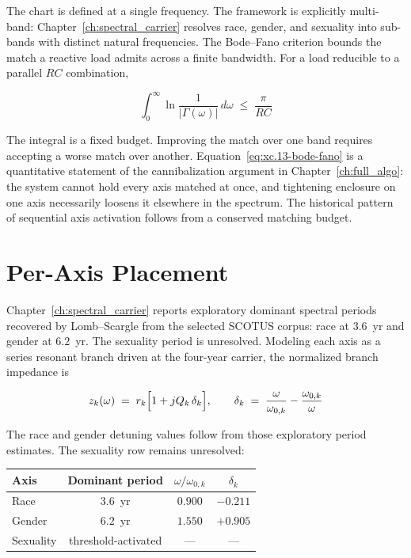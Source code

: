 The chart is defined at a single frequency. The framework is explicitly multi-band:
Chapter~\ref{ch:spectral_carrier} resolves race, gender, and sexuality into sub-bands with distinct
natural frequencies. The Bode--Fano criterion bounds the match a reactive load admits across a
finite bandwidth. For a load reducible to a parallel $RC$ combination,

\begin{equation}\label{eq:xc.13-bode-fano}
\int_{0}^{\infty} \ln\frac{1}{|\Gamma(\omega)|}\, d\omega \;\leq\; \frac{\pi}{RC}
\end{equation}

The integral is a fixed budget. Improving the match over one band requires accepting a worse match
over another. Equation~\ref{eq:xc.13-bode-fano} is a quantitative statement of the cannibalization
argument in Chapter~\ref{ch:full_algo}: the system cannot hold every axis matched at once, and
tightening enclosure on one axis necessarily loosens it elsewhere in the spectrum. The historical
pattern of sequential axis activation follows from a conserved matching budget.

\section{Per-Axis Placement}
\label{sec:xc_axes}

Chapter~\ref{ch:spectral_carrier} reports exploratory dominant spectral periods recovered by
Lomb--Scargle from the selected SCOTUS corpus: race at $3.6$~yr and gender at $6.2$~yr. The
sexuality period is unresolved. Modeling each axis as a series resonant branch driven at the
four-year carrier, the normalized branch impedance is

\begin{equation}\label{eq:xc.14-branch-impedance}
z_k(\omega) \;=\; r_k\Bigl[1 + jQ_k\,\delta_k\Bigr], \qquad
\delta_k \;=\; \frac{\omega}{\omega_{0,k}} - \frac{\omega_{0,k}}{\omega}
\end{equation}

The race and gender detuning values follow from those exploratory period estimates. The sexuality
row remains unresolved:

\begin{center}
\begin{tabular}{lccc}
\toprule
Axis & Dominant period & $\omega/\omega_{0,k}$ & $\delta_k$ \\
\midrule
Race       & $3.6$~yr & $0.900$ & $-0.211$ \\
Gender     & $6.2$~yr & $1.550$ & $+0.905$ \\
Sexuality  & threshold-activated & --- & --- \\
\bottomrule
\end{tabular}
\end{center}

